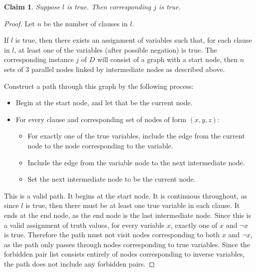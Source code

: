 \documentclass[11pt]{article}
\newtheorem{claim}{Claim}
\begin{document}
\begin{claim}
    Suppose $l$ is true. Then corresponding $j$ is true.  
\end{claim}
\begin{proof}
    

    Let $n$ be the number of clauses in $l$.

    If $l$ is true, then there exists an assignment of variables such that, for each clause in $l$, at least one of the variables (after possible negation) is true. The corresponding instance $j$ of $D$ will consist of a graph with a start node, then $n$ sets of 3 parallel nodes linked by intermediate nodes as described above. 

    Construct a path through this graph by the following process: \begin{itemize}
        \item Begin at the start node, and let that be the current node.
        \item For every clause and corresponding set of nodes of form $(x, y, z)$:
        \begin{itemize}
            \item For exactly one of the true variables, include the edge from the current node to the node corresponding to the variable.
            \item Include the edge from the variable node to the next intermediate node.
            \item Set the next intermediate node to be the current node.
        \end{itemize}
    \end{itemize}

    This is a valid path. It begins at the start node. It is continuous throughout, as since $l$ is true, then there must be at least one true variable in each clause. It ends at the end node, as the end node is the last intermediate node. Since this is a valid assignment of truth values, for every variable $x$, exactly one of $x$ and $\lnot x$ is true. Therefore the path must not visit nodes corresponding to both $x$ and $\lnot x$, as the path only passes through nodes corresponding to true variables. Since the forbidden pair list consists entirely of nodes corresponding to inverse variables, the path does not include any forbidden pairs. 
\end{proof}
\end{document}
